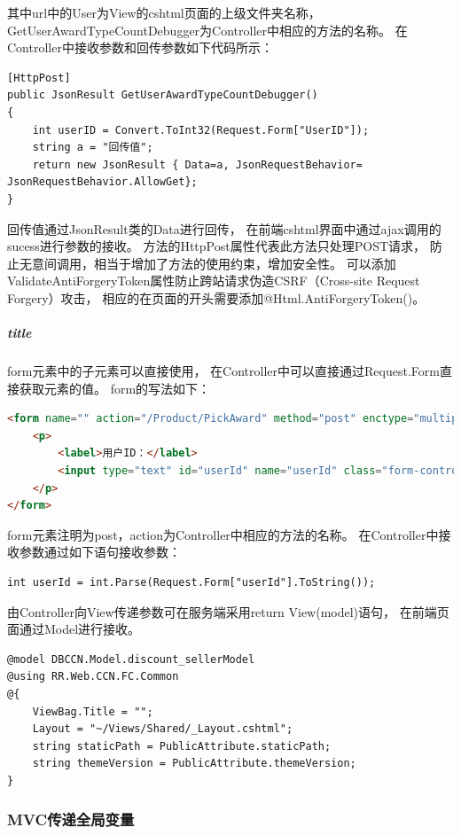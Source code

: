 \documentclass{book}
\begin{document}
其中url中的User为View的cshtml页面的上级文件夹名称，
GetUserAwardTypeCountDebugger为Controller中相应的方法的名称。
在Controller中接收参数和回传参数如下代码所示：

\begin{lstlisting}[language={[Sharp]C}]
[HttpPost]
public JsonResult GetUserAwardTypeCountDebugger()
{
    int userID = Convert.ToInt32(Request.Form["UserID"]);
    string a = "回传值";
    return new JsonResult { Data=a, JsonRequestBehavior= JsonRequestBehavior.AllowGet};
}
\end{lstlisting}

回传值通过JsonResult类的Data进行回传，
在前端cshtml界面中通过ajax调用的sucess进行参数的接收。
方法的HttpPost属性代表此方法只处理POST请求，
防止无意间调用，相当于增加了方法的使用约束，增加安全性。
可以添加ValidateAntiForgeryToken属性防止跨站请求伪造CSRF（Cross-site Request Forgery）攻击，
相应的在页面的开头需要添加@Html.AntiForgeryToken()。
\subparagraph{title}

form元素中的子元素可以直接使用，
在Controller中可以直接通过Request.Form直接获取元素的值。
form的写法如下：

\begin{lstlisting}[language=HTML]
<form name="" action="/Product/PickAward" method="post" enctype="multipart/form-data">
    <p>
        <label>用户ID：</label>
        <input type="text" id="userId" name="userId" class="form-control" placeholder="用户ID"/>
    </p>
</form>
\end{lstlisting}

form元素注明为post，action为Controller中相应的方法的名称。
在Controller中接收参数通过如下语句接收参数：

\begin{lstlisting}[language={[Sharp]C}]
int userId = int.Parse(Request.Form["userId"].ToString());
\end{lstlisting}

由Controller向View传递参数可在服务端采用return View(model)语句，
在前端页面通过Model进行接收。

\begin{lstlisting}[language={[Sharp]C}]
@model DBCCN.Model.discount_sellerModel
@using RR.Web.CCN.FC.Common
@{
    ViewBag.Title = "";
    Layout = "~/Views/Shared/_Layout.cshtml";
    string staticPath = PublicAttribute.staticPath;
    string themeVersion = PublicAttribute.themeVersion;   
}
\end{lstlisting}

\subsubsection{MVC传递全局变量}
\end{document}
